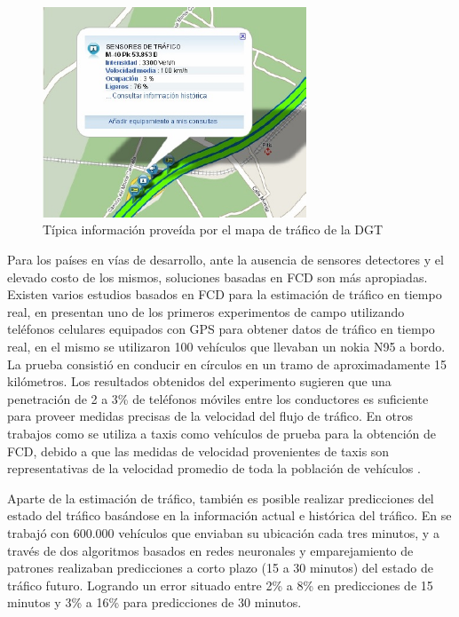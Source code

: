 \begin{figure}[h]
	\centering
	\includegraphics[width=0.7\textwidth]{capitulos/5/figuras/figura2.jpg}
	\caption{\label{fig:mapaTrafico} Típica información proveída por el mapa de tráfico de la DGT}	
\end{figure}

 Para los países en vías de desarrollo, ante la ausencia de sensores detectores y el elevado costo de los mismos, soluciones basadas en FCD son más apropiadas. Existen varios estudios basados en FCD para la estimación de tráfico en tiempo real, en \cite{herrera2010evaluation} presentan uno de los primeros experimentos de campo utilizando teléfonos celulares equipados con GPS para obtener datos de tráfico en tiempo real, en el mismo se utilizaron 100 vehículos que llevaban un nokia N95 a bordo. La prueba consistió en conducir en círculos en un tramo de aproximadamente 15 kilómetros. Los resultados obtenidos del experimento sugieren que una penetración de 2 a 3\% de teléfonos móviles entre los conductores es suficiente para proveer medidas precisas de la velocidad del flujo de tráfico. En otros trabajos como \cite{reinthaler2007evaluation} se utiliza a taxis como vehículos de prueba para la obtención de FCD, debido a que las medidas de velocidad provenientes de taxis son representativas de la velocidad promedio de toda la población de vehículos \cite{linauer2004fleet}. 

Aparte de la estimación de tráfico, también es posible realizar predicciones del estado del tráfico basándose en la información actual e histórica del tráfico. En \cite{de2008traffic} se trabajó con 600.000 vehículos que enviaban su ubicación cada tres minutos, y a través de dos algoritmos basados en redes neuronales y emparejamiento de patrones realizaban predicciones a corto plazo (15 a 30 minutos) del estado de tráfico futuro. Logrando un error situado entre 2\% a 8\% en predicciones de 15 minutos y 3\% a 16\% para predicciones de 30 minutos.